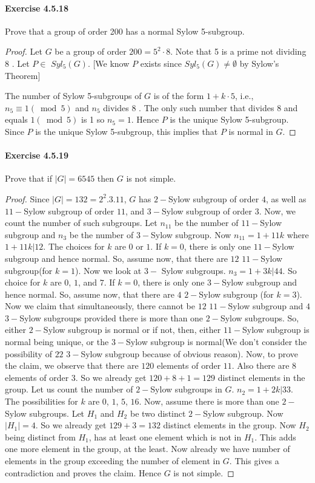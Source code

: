 \documentclass{article}
\theoremstyle{definition}
\begin{document}
\paragraph{Exercise 4.5.18} Prove that a group of order 200 has a normal Sylow 5-subgroup.
\begin{proof}
    Let $G$ be a group of order $200=5^2 \cdot 8$. Note that 5 is a prime not dividing 8 . Let $P \in$ $S y l_5(G)$. [We know $P$ exists since $S y l_5(G) \neq \emptyset$ by Sylow's Theorem]

The number of Sylow 5-subgroups of $G$ is of the form $1+k \cdot 5$, i.e., $n_5 \equiv 1(\bmod 5)$ and $n_5$ divides 8 . The only such number that divides 8 and equals $1 (\bmod 5)$ is 1 so $n_5=1$. Hence $P$ is the unique Sylow 5-subgroup.
Since $P$ is the unique Sylow 5-subgroup, this implies that $P$ is normal in $G$.
\end{proof}


\paragraph{Exercise 4.5.19} Prove that if $|G|=6545$ then $G$ is not simple.
\begin{proof}    
Since $|G|=132=2^{2}.3.11$, $G$ has $2-$Sylow subgroup of order $4$, as well as $11-$Sylow subgroup of order $11$, and $3-$Sylow subgroup of order $3$. Now, we count the number of such subgroups. Let $n_{11}$ be the number of  $11-$Sylow subgroup and $n_{3}$ be the number of  $3-$Sylow subgroup. Now $n_{11}=1+11k$ where $1+11k|12$. The choices for $k$ are $0$ or $1$. If $k=0$, there is only one $11-$Sylow subgroup and hence normal. So, assume now, that there are $12$ $11-$Sylow subgroup(for $k=1$). Now we look at $3-$ Sylow subgroups. $n_{3}=1+3k| 44$. So choice for $k$ are $0$, $1$, and $7$. If $k=0$, there is only one $3-$Sylow subgroup and hence normal. So, assume now, that there are $4$ $2-$Sylow subgroup (for $k=3$). Now we claim that simultaneously, there cannot be $12$ $11-$Sylow subgroup and $4$ $3-$Sylow subgroups provided there is more than one $2-$Sylow subgroups. So, either $2-$Sylow subgroup is normal or if not, then, either $11-$Sylow subgroup is normal being unique, or  the $3-$Sylow subgroup is normal(We don't consider the possibility of $22$ $3-$Sylow subgroup because of obvious reason). Now, to prove the claim, we observe that there are $120$ elements of order $11$. Also there are $8$ elements of order $3$. So we already get $120+8+1=129$ distinct elements in the group. Let us count the number of $2-$Sylow subgroups in $G$. $n_{2}=1+2k|33$. The possibilities for $k$ are $0$, $1$, $5$, $16$. Now, assume there is more than one $2-$Sylow subgroups. Let $H_{1}$ and $H_{2}$ be two distinct  $2-$Sylow subgroup. Now $|H_{1}|=4$. So we already get $129+3=132$ distinct elements in the group. Now $H_{2}$ being distinct from $H_{1}$, has at least one element which is not in $H_{1}$. This adds one more element in the group, at the least. Now already we have number of elements in the group exceeding the number of element in $G$. This gives a contradiction and proves the claim.
Hence $G$ is not simple.
\end{proof}
\end{document}
